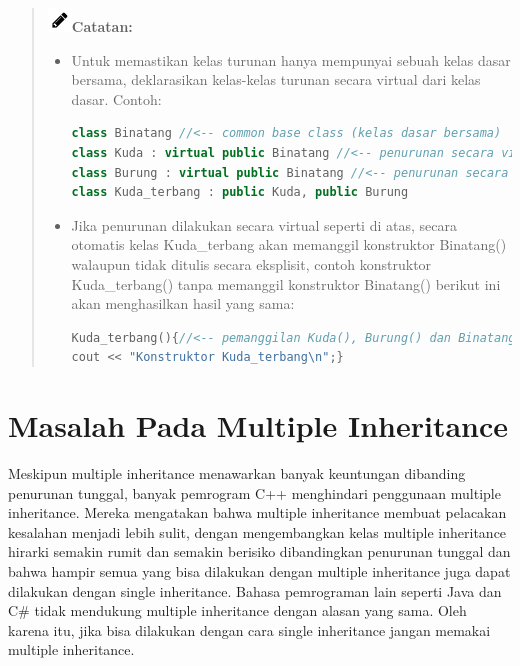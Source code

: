 \begin{quotation}
\includegraphics{../manuscript/images/pencil}\textbf{Catatan:}
	
\begin{itemize}
\item Untuk memastikan kelas turunan hanya mempunyai sebuah kelas dasar bersama,
deklarasikan kelas-kelas turunan secara virtual dari kelas dasar. Contoh:

\begin{lstlisting}[language=c++, numbers=none]
class Binatang //<-- common base class (kelas dasar bersama)
class Kuda : virtual public Binatang //<-- penurunan secara virtual
class Burung : virtual public Binatang //<-- penurunan secara virtual
class Kuda_terbang : public Kuda, public Burung
\end{lstlisting}

\item Jika penurunan dilakukan secara virtual seperti di atas, secara otomatis kelas
Kuda\_terbang akan memanggil konstruktor Binatang() walaupun tidak ditulis
secara eksplisit, contoh konstruktor Kuda\_terbang() tanpa memanggil konstruktor
Binatang() berikut ini akan menghasilkan hasil yang sama:
		
\begin{lstlisting}[language=c++, numbers=none]
Kuda_terbang(){//<-- pemanggilan Kuda(), Burung() dan Binatang() implisit
cout << "Konstruktor Kuda_terbang\n";}
\end{lstlisting}
\end{itemize}

\end{quotation}




\section{Masalah Pada Multiple Inheritance}\label{masalah-pada-multiple-inheritance}

Meskipun multiple inheritance menawarkan banyak keuntungan dibanding
penurunan tunggal, banyak pemrogram C++ menghindari penggunaan multiple
inheritance. Mereka mengatakan bahwa multiple inheritance membuat
pelacakan kesalahan menjadi lebih sulit, dengan mengembangkan kelas
multiple inheritance hirarki semakin rumit dan semakin berisiko
dibandingkan penurunan tunggal dan bahwa hampir semua yang bisa
dilakukan dengan multiple inheritance juga dapat dilakukan dengan single
inheritance. Bahasa pemrograman lain seperti Java dan C\# tidak
mendukung multiple inheritance dengan alasan yang sama. Oleh karena itu,
jika bisa dilakukan dengan cara single inheritance jangan memakai
multiple inheritance.

